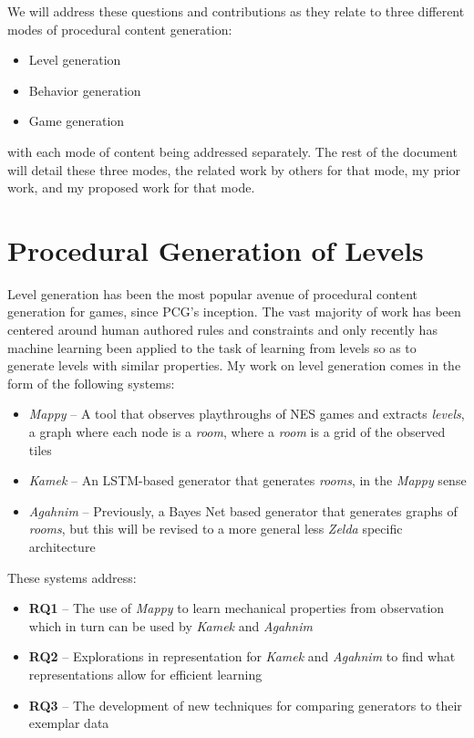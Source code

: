 \documentclass[12pt]{report}
\begin{document}
We will address these questions and contributions as they relate to three different modes of procedural content generation:

\begin{itemize}
\item Level generation
\item Behavior generation
\item Game generation
\end{itemize}

\noindent with each mode of content being addressed separately.  The rest of the document will detail these three modes, the related work by others for that mode, my prior work, and my proposed work for that mode.


\chapter*{Procedural Generation of Levels}

Level generation has been the most popular avenue of procedural content generation for games, since PCG's inception.  The vast majority of work has been centered around human authored rules and constraints and only recently has machine learning been applied to the task of learning from levels so as to generate levels with similar properties.  My work on level generation comes in the form of the following systems:

\begin{itemize}
\item \textit{Mappy} -- A tool that observes playthroughs of NES games and extracts \textit{levels}, a graph where each node is a \textit{room}, where a \textit{room} is a grid of the observed tiles
\item \textit{Kamek} -- An LSTM-based generator that generates \textit{rooms}, in the \textit{Mappy} sense 
\item \textit{Agahnim} -- Previously, a Bayes Net based generator that generates graphs of \textit{rooms}, but this will be revised to a more general less \textit{Zelda} specific architecture

\end{itemize}

These systems address:

\begin{itemize}
\item \textbf{RQ1} -- The use of \textit{Mappy} to learn mechanical properties from observation which in turn can be used by \textit{Kamek} and \textit{Agahnim}
\item \textbf{RQ2} -- Explorations in representation for \textit{Kamek} and \textit{Agahnim} to find what representations allow for efficient learning
\item \textbf{RQ3} -- The development of new techniques for comparing generators to their exemplar data 
\end{itemize}
\end{document}
